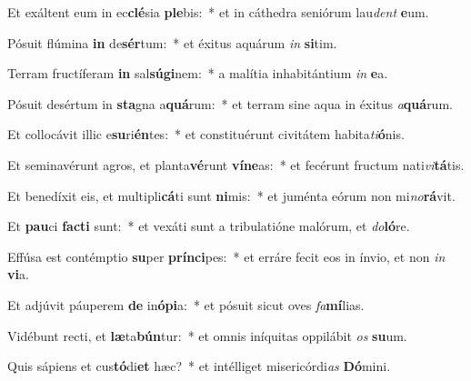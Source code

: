 \item Et exáltent eum in ec\textbf{clé}sia \textbf{ple}bis:~* et in cáthedra seniórum lau\textit{dent} \textbf{e}um.
\item Pósuit flúmina \textbf{in} de\textbf{sér}tum:~* et éxitus aquárum \textit{in} \textbf{si}tim.
\item Terram fructíferam \textbf{in} sal\textbf{sú}\textbf{gi}nem:~* a malítia inhabitántium \textit{in} \textbf{e}a.
\item Pósuit desértum in \textbf{sta}gna a\textbf{quá}rum:~* et terram sine aqua in éxitus \textit{a}\textbf{quá}rum.
\item Et collocávit illic e\textbf{su}ri\textbf{én}tes:~* et constituérunt civitátem habita\textit{ti}\textbf{ó}nis.
\item Et seminavérunt agros, et planta\textbf{vé}runt \textbf{ví}\textbf{ne}as:~* et fecérunt fructum nati\textit{vi}\textbf{tá}tis.
\item Et benedíxit eis, et multipli\textbf{cá}ti sunt \textbf{ni}mis:~* et juménta eórum non mi\textit{no}\textbf{rá}vit.
\item Et \textbf{pau}ci \textbf{fac}\textbf{ti} sunt:~* et vexáti sunt a tribulatióne malórum, et \textit{do}\textbf{ló}re.
\item Effúsa est contémptio \textbf{su}per \textbf{prín}\textbf{ci}pes:~* et erráre fecit eos in ínvio, et non \textit{in} \textbf{vi}a.
\item Et adjúvit páuperem \textbf{de} in\textbf{ó}\textbf{pi}a:~* et pósuit sicut oves \textit{fa}\textbf{mí}lias.
\item Vidébunt recti, et \textbf{læ}ta\textbf{bún}tur:~* et omnis iníquitas oppilábit \textit{os} \textbf{su}um.
\item Quis sápiens et cus\textbf{tó}di\textbf{et} hæc?~* et intélliget misericórdi\textit{as} \textbf{Dó}mini.

